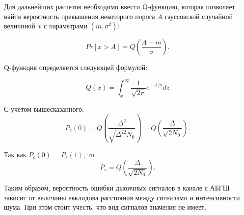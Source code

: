 Для дальнейших расчетов необходимо ввести Q-функцию, которая позволяет найти вероятность превышения некоторого порога $A$ гауссовской случайной величиной $x$ с параметрами $(m,\sigma^2)$:

\begin{equation}
	Pr[x > A] = Q(\frac{A - m}{\sigma}).
\end{equation}

Q-функция определяется следующей формулой:

\begin{equation}
	Q(x) = \int_{x}^{\infty}{\frac{1}{\sqrt{2\pi}}}e^{-z^2 / 2}dz
\end{equation} 

С учетом вышесказанного:
\begin{equation}
	P_e(0) = Q(\frac{\Delta^2}{\sqrt{\Delta^22N_0}}) = Q(\frac{\Delta}{\sqrt{2N_0}}).
\end{equation}

Так как $P_e(0)$ = $P_e(1)$, то
\begin{equation}
	P_e = Q(\frac{\Delta}{\sqrt{2N_0}}).
\end{equation}

Таким образом, вероятность ошибки дыоичных сигналов в канале с АБГШ зависит от величины евклидова расстояния между сигналами и интенсивности шума. При этом стоит учесть, что вид сигналов значения не имеет.